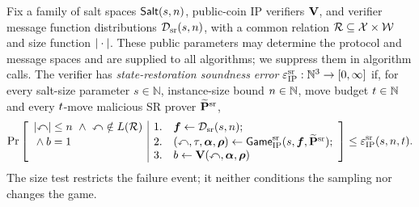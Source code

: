 \begin{definition}
  \label{def:ip_state_restoration_soundness}
  Fix a family of salt spaces \(\mathsf{Salt}(s,n)\), public-coin IP verifiers \(\mathbf{V}\), and verifier message function distributions \(\mathcal{D}_{\mathrm{sr}}(s,n)\), with a common relation \(\mathcal{R}\subseteq\mathcal X\times\mathcal W\) and size function \(|\cdot|\). These public parameters may determine the protocol and message spaces and are supplied to all algorithms; we suppress them in algorithm calls. The verifier has \emph{state-restoration soundness error} \(\varepsilon_{\mathrm{IP}}^{\mathrm{sr}}:\mathbb N^3\to[0,\infty]\) if, for every salt-size parameter \(s\in\mathbb N\), instance-size bound \(n\in\mathbb N\), move budget \(t\in\mathbb N\) and every \(t\)-move malicious SR prover \(\widetilde{\mathbf P}^{\mathrm{sr}}\),
  \begin{equation*}
    \Pr\left[\begin{array}{l|rl}
      \InstanceSizeOf{\Instance}\le\InstanceSizeBound\ \land\ \Instance\notin\RelationLanguage{\Relation}
        & 1. & \OracleFamily\leftarrow\SRChallengeOracleDistribution(s,\InstanceSizeBound);\\
      {}\land b=1
        & 2. & (\Instance,\SaltString,\IPProverMessages,\IPVerifierMessages)\leftarrow
          \IPStateRestorationGame{s}{\OracleFamily}{\IPMaliciousSRProver};\\
        & 3. & b\leftarrow \IPVerifier(\Instance,\IPProverMessages,\IPVerifierMessages)
    \end{array}\right]\le\IPSRSoundnessError(s,\InstanceSizeBound,\SRMoveBound).
  \end{equation*}
  The size test restricts the failure event; it neither conditions the sampling nor changes the game.
  \leanok
\end{definition}

